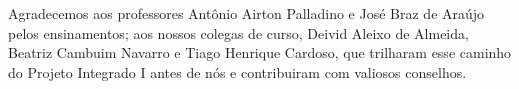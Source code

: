 \begin{agradecimentos}
    Agradecemos aos professores Antônio Airton Palladino e José Braz de Araújo pelos ensinamentos;
    aos nossos colegas de curso, Deivid Aleixo de Almeida, Beatriz Cambuim Navarro e Tiago Henrique Cardoso, que trilharam esse caminho do Projeto Integrado I antes de nós e contribuiram com valiosos conselhos.
    
    

\end{agradecimentos}
